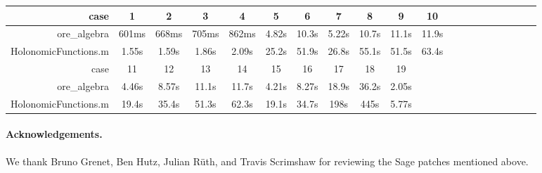 \documentclass[11pt]{article}
\begin{document}
\begin{center}
  \begin{tabular}{rccccccccccccccccccc}
    \toprule
    case & 1 & 2 & 3 & 4 & 5 & 6 & 7 & 8 & 9 & 10 \\\midrule
    ore\_algebra & 601ms & 668ms & 705ms & 862ms & 4.82s & 10.3s & 5.22s & 10.7s & 11.1s & 11.9s \\
    HolonomicFunctions.m & 1.55s & 1.59s & 1.86s & 2.09s & 25.2s & 51.9s & 26.8s & 55.1s & 51.5s &
    63.4s \\
    \midrule
    case & 11 & 12 & 13 & 14 & 15 & 16 & 17 & 18 & 19 \\\midrule
    ore\_algebra & 4.46s & 8.57s & 11.1s & 11.7s & 4.21s & 8.27s & 18.9s & 36.2s & 2.05s \\
    HolonomicFunctions.m & 19.4s & 35.4s & 51.3s & 62.3s & 19.1s & 34.7s & 198s & 445s & 5.77s \\
    \bottomrule
  \end{tabular}
\end{center}

\paragraph{Acknowledgements.}

We thank Bruno Grenet, Ben Hutz, Julian Rüth, and Travis Scrimshaw for reviewing the Sage patches
mentioned above.

\small


\end{document}
